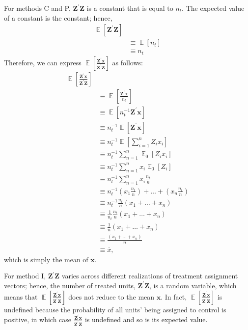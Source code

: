 \documentclass[
  12pt,
  leqno]{article}
\DeclareMathOperator{\E}{\mathbb{E}}
\begin{document}
For methods C and P, \(\mathbf{Z}^{\prime}\mathbf{Z}\) is a constant
that is equal to \(n_t\). The expected value of a constant is the
constant; hence, \begin{align*}
\E\left[\mathbf{Z}^{\prime}\mathbf{Z}\right] \\
& \equiv \E\left[n_t\right] \\
& \equiv n_t
\end{align*} Therefore, we can express
\(\E\left[\frac{\mathbf{Z}^{\prime}\mathbf{x}}{\mathbf{Z}^{\prime}\mathbf{Z}}\right]\)
as follows: \begin{align*}
\E\left[\frac{\mathbf{Z}^{\prime}\mathbf{x}}{\mathbf{Z}^{\prime}\mathbf{Z}}\right] \\
& \equiv \E\left[\frac{\mathbf{Z}^{\prime}\mathbf{x}}{n_t}\right] \\
& \equiv \E\left[n_t^{-1}\mathbf{Z}^{\prime}\mathbf{x}\right] \\
& \equiv n_t^{-1} \E\left[\mathbf{Z}^{\prime}\mathbf{x}\right] \\
& \equiv n_t^{-1} \E\left[\sum \limits_{i = 1}^n Z_i x_i\right] \\
& \equiv n_t^{-1} \sum \limits_{n = 1}^n \E_0\left[Z_i x_i\right]  \\
& \equiv n_t^{-1} \sum \limits_{n = 1}^n x_i \E_0\left[Z_i\right]  \\
& \equiv n_t^{-1} \sum \limits_{n = 1}^n x_i \frac{n_t}{n} \\
& \equiv n_t^{-1}  \left(x_{1} \frac{n_t}{n}\right) + \dots + \left(x_n \frac{n_t}{n}\right)  \\
& \equiv n_t^{-1} \frac{n_t}{n} \left(x_1 + \dots + x_n\right) \\
& \equiv \frac{1}{n_t} \frac{n_t}{n} \left(x_1 + \dots + x_n\right)  \\
& \equiv \frac{1}{n} \left(x_1 + \dots + x_n\right)  \\
& \equiv \frac{\left(x_1 + \dots + x_n\right)}{n} \\
& \equiv \overline{x},
\end{align*} which is simply the mean of \(\mathbf{x}\).

For method I, \(\mathbf{Z}^{\prime}\mathbf{Z}\) varies across different
realizations of treatment assignment vectors; hence, the number of
treated units, \(\mathbf{Z}^{\prime}\mathbf{Z}\), is a random variable,
which means that
\(\E\left[\frac{\mathbf{Z}^{\prime}\mathbf{x}}{\mathbf{Z}^{\prime}\mathbf{Z}}\right]\)
does not reduce to the mean \(\mathbf{x}\). In fact,
\(\E\left[\frac{\mathbf{Z}^{\prime}\mathbf{x}}{\mathbf{Z}^{\prime}\mathbf{Z}}\right]\)
is undefined because the probability of all units' being assigned to
control is positive, in which case
\(\frac{\mathbf{Z}^{\prime}\mathbf{x}}{\mathbf{Z}^{\prime}\mathbf{Z}}\)
is undefined and so is its expected value.

\newpage

\renewcommand\refname{References}
  
\end{document}
